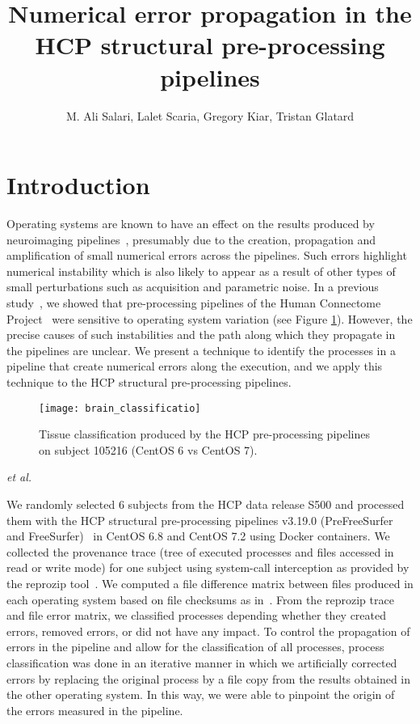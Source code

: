 \documentclass{article}
\title{Numerical error propagation in the HCP structural pre-processing pipelines}
\author{M. Ali Salari, Lalet Scaria, Gregory Kiar, Tristan Glatard}
\newcommand{\todo}[2]{\pdfmargincomment[color=red,author=#1,open=true]{#2}}
\begin{document}
\maketitle

\abstract{}

\section{Introduction}

Operating systems are known to have an effect on the results produced by neuroimaging pipelines~\cite{Gronenschild2012, Glatard2015}, 
presumably due to the creation, propagation and amplification of small numerical errors across the pipelines. 
Such errors highlight numerical instability which is also likely to appear as a result of other types of small 
perturbations such as acquisition and parametric noise. In a previous study~\cite{Scaria2017}, 
we showed that pre-processing pipelines of the Human Connectome Project~\cite{Glasser2013} were sensitive to operating system variation (see Figure \ref{fig:1}). 
However, the precise causes of such instabilities and the path along which they propagate in the pipelines are unclear. 
We present a technique to identify the processes in a pipeline that create numerical errors along the execution, 
and we apply this technique to the HCP structural pre-processing pipelines. 

\begin{figure}
  \texttt{[image: brain\_classificatio]}
  \caption{Tissue classification produced by the HCP pre-processing pipelines on subject 105216 (CentOS 6 vs CentOS 7).}
  \label{fig:1}
\end{figure}


 \emph{et al.}

\todo{Link this to Lindsay's HBM 2017 poster and to Redolfi et al.}

\section{Methods}

We randomly selected 6 subjects from the HCP data release S500 and processed them with 
the HCP structural pre-processing pipelines v3.19.0 (PreFreeSurfer and FreeSurfer)~\cite{Glasser2013} 
in CentOS 6.8 and CentOS 7.2 using Docker containers. We collected the provenance trace 
(tree of executed processes and files accessed in read or write mode) for one subject 
using system-call interception as provided by the reprozip tool~\cite{5}. We computed a file difference matrix 
between files produced in each operating system based on file checksums as in~\cite{Scaria2017}.
From the reprozip trace and file error matrix, we classified processes depending whether they created errors, 
removed errors, or did not have any impact. To control the propagation of errors in the pipeline and allow 
for the classification of all processes, process classification was done in an iterative manner in which we 
artificially corrected errors by replacing the original process by a file copy from the results obtained 
in the other operating system. In this way, we were able to pinpoint the origin of the errors measured in the pipeline. 
\end{document}
